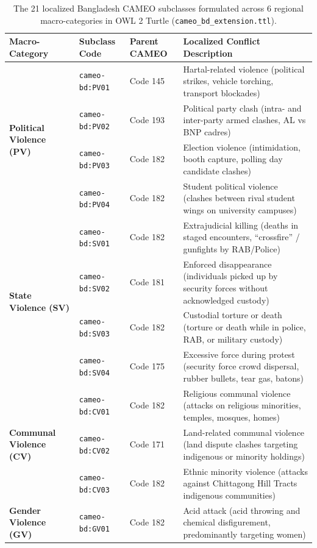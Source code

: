 \documentclass[11pt,a4paper]{article}
\begin{document}
\begin{table}[h]
\centering
\caption{The 21 localized Bangladesh CAMEO subclasses formulated across 6 regional macro-categories in OWL 2 Turtle (\texttt{cameo\_bd\_extension.ttl}).}
\label{tab:cameo_ext}
\small
\begin{tabular}{lllp{7.5cm}}
\toprule
\textbf{Macro-Category} & \textbf{Subclass Code} & \textbf{Parent CAMEO} & \textbf{Localized Conflict Description} \\
\midrule
\multirow{4}{*}{\textbf{Political Violence (PV)}} 
& \texttt{cameo-bd:PV01} & Code 145 & Hartal-related violence (political strikes, vehicle torching, transport blockades) \\
& \texttt{cameo-bd:PV02} & Code 193 & Political party clash (intra- and inter-party armed clashes, AL vs BNP cadres) \\
& \texttt{cameo-bd:PV03} & Code 182 & Election violence (intimidation, booth capture, polling day candidate clashes) \\
& \texttt{cameo-bd:PV04} & Code 182 & Student political violence (clashes between rival student wings on university campuses) \\
\midrule
\multirow{4}{*}{\textbf{State Violence (SV)}} 
& \texttt{cameo-bd:SV01} & Code 182 & Extrajudicial killing (deaths in staged encounters, ``crossfire'' / gunfights by RAB/Police) \\
& \texttt{cameo-bd:SV02} & Code 181 & Enforced disappearance (individuals picked up by security forces without acknowledged custody) \\
& \texttt{cameo-bd:SV03} & Code 182 & Custodial torture or death (torture or death while in police, RAB, or military custody) \\
& \texttt{cameo-bd:SV04} & Code 175 & Excessive force during protest (security force crowd dispersal, rubber bullets, tear gas, batons) \\
\midrule
\multirow{3}{*}{\textbf{Communal Violence (CV)}} 
& \texttt{cameo-bd:CV01} & Code 182 & Religious communal violence (attacks on religious minorities, temples, mosques, homes) \\
& \texttt{cameo-bd:CV02} & Code 171 & Land-related communal violence (land dispute clashes targeting indigenous or minority holdings) \\
& \texttt{cameo-bd:CV03} & Code 182 & Ethnic minority violence (attacks against Chittagong Hill Tracts indigenous communities) \\
\midrule
\multirow{4}{*}{\textbf{Gender Violence (GV)}} 
& \texttt{cameo-bd:GV01} & Code 182 & Acid attack (acid throwing and chemical disfigurement, predominantly targeting women) \\

\end{tabular}
\end{table}
\end{document}
